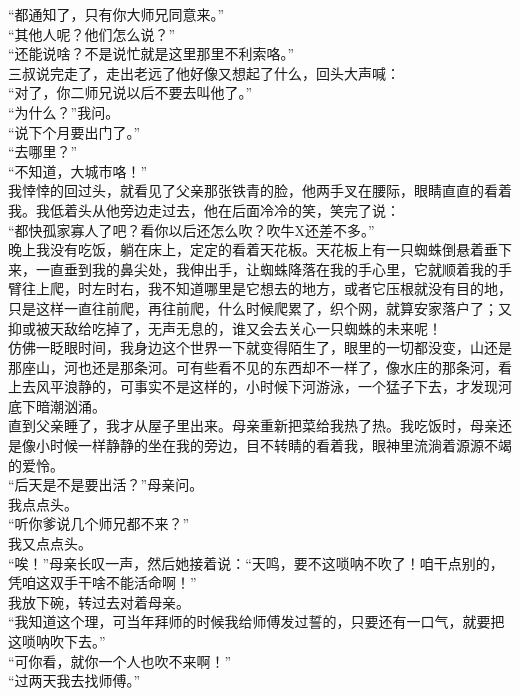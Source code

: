 “都通知了，只有你大师兄同意来。”\\

“其他人呢？他们怎么说？”\\

“还能说啥？不是说忙就是这里那里不利索咯。”\\

三叔说完走了，走出老远了他好像又想起了什么，回头大声喊：\\

“对了，你二师兄说以后不要去叫他了。”\\

“为什么？”我问。\\

“说下个月要出门了。”\\

“去哪里？”\\

“不知道，大城市咯！”\\

我悻悻的回过头，就看见了父亲那张铁青的脸，他两手叉在腰际，眼睛直直的看着我。我低着头从他旁边走过去，他在后面冷冷的笑，笑完了说：\\

“都快孤家寡人了吧？看你以后还怎么吹？吹牛X还差不多。”\\

晚上我没有吃饭，躺在床上，定定的看着天花板。天花板上有一只蜘蛛倒悬着垂下来，一直垂到我的鼻尖处，我伸出手，让蜘蛛降落在我的手心里，它就顺着我的手臂往上爬，时左时右，我不知道哪里是它想去的地方，或者它压根就没有目的地，只是这样一直往前爬，再往前爬，什么时候爬累了，织个网，就算安家落户了；又抑或被天敌给吃掉了，无声无息的，谁又会去关心一只蜘蛛的未来呢！\\

仿佛一眨眼时间，我身边这个世界一下就变得陌生了，眼里的一切都没变，山还是那座山，河也还是那条河。可有些看不见的东西却不一样了，像水庄的那条河，看上去风平浪静的，可事实不是这样的，小时候下河游泳，一个猛子下去，才发现河底下暗潮汹涌。\\

直到父亲睡了，我才从屋子里出来。母亲重新把菜给我热了热。我吃饭时，母亲还是像小时候一样静静的坐在我的旁边，目不转睛的看着我，眼神里流淌着源源不竭的爱怜。\\

“后天是不是要出活？”母亲问。\\

我点点头。\\

“听你爹说几个师兄都不来？”\\

我又点点头。\\

“唉！”母亲长叹一声，然后她接着说：“天鸣，要不这唢呐不吹了！咱干点别的，凭咱这双手干啥不能活命啊！”\\

我放下碗，转过去对着母亲。\\

“我知道这个理，可当年拜师的时候我给师傅发过誓的，只要还有一口气，就要把这唢呐吹下去。”\\

“可你看，就你一个人也吹不来啊！”\\

“过两天我去找师傅。”\\